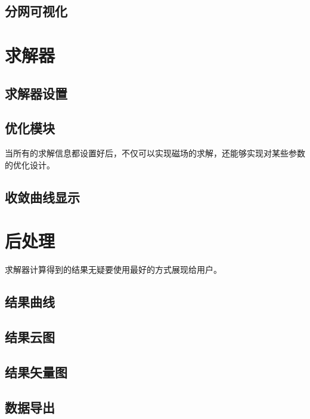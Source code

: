 \subsection{分网可视化}

\section{求解器}

\subsection{求解器设置}

\subsection{优化模块}
当所有的求解信息都设置好后，不仅可以实现磁场的求解，还能够实现对某些参数的优化设计。

\subsection{收敛曲线显示}

\section{后处理}
求解器计算得到的结果无疑要使用最好的方式展现给用户。
\subsection{结果曲线}

\subsection{结果云图}

\subsection{结果矢量图}

\subsection{数据导出}